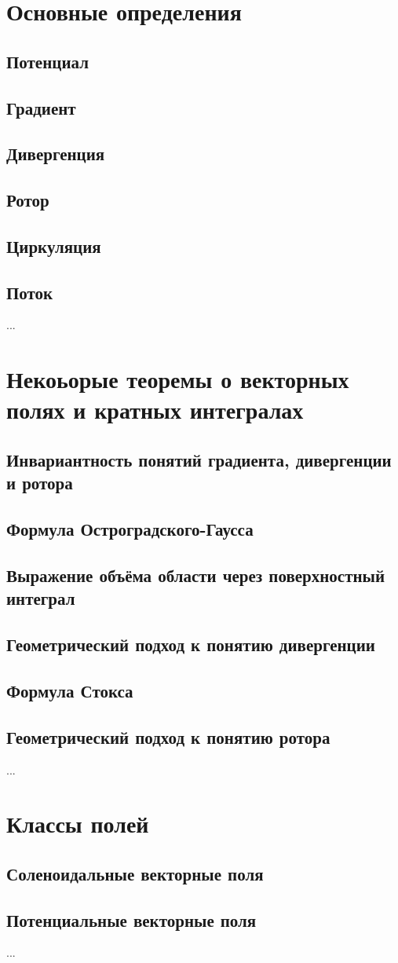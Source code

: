 \section{Основные определения}
\subsection{Потенциал}
\subsection{Градиент}
\subsection{Дивергенция}
\subsection{Ротор}
\subsection{Циркуляция}
\subsection{Поток}
...

\section{Некоьорые теоремы о векторных полях и кратных интегралах}
\subsection{Инвариантность понятий градиента, дивергенции и ротора}
\subsection{Формула Остроградского-Гаусса}
\subsection{Выражение объёма области через поверхностный интеграл}
\subsection{Геометрический подход к понятию дивергенции}
\subsection{Формула Стокса}
\subsection{Геометрический подход к понятию ротора}
...

\section{Классы полей}
\subsection{Соленоидальные векторные поля}
\subsection{Потенциальные векторные поля}
...

